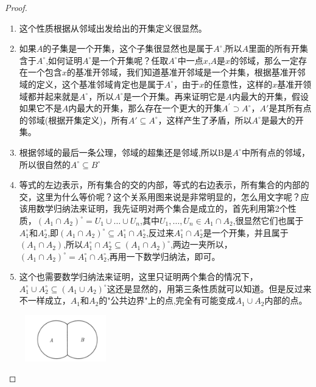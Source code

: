 \begin{proof}
\begin{enumerate}
	\item 这个性质根据从邻域出发给出的开集定义很显然。
	\item 如果$A$的子集是一个开集，这个子集很显然也是属于$A^{\circ}$,所以$A$里面的所有开集含于$A^{\circ}$,如何证明$A^{\circ}$是一个开集呢？任取$A^{\circ}$中一点$x$,$A$是$x$的邻域，那么一定存在一个包含$x$的基准开邻域，我们知道基准开邻域是一个并集，根据基准开邻域的定义，这个基准邻域肯定也是属于$A^{\circ}$，由于$x$的任意性，这样的$x$基准开领域都并起来就是$A^{\circ}$，所以$A^{\circ}$是一个开集。再来证明它是$A$内最大的开集，假设如果它不是$A$内最大的开集，那么存在一个更大的开集$A^{'} \supset A^{\circ}$，$A'$是其所有点的邻域(根据开集定义)，所有$A' \subseteq A^{\circ}$，这样产生了矛盾，所以$A^{\circ}$是最大的开集。
	\item 根据邻域的最后一条公理，邻域的超集还是邻域,所以B是$A^{\circ}$中所有点的邻域，所以很自然的$A^{\circ} \subseteq B^{\circ}$
	\item 等式的左边表示，所有集合的交的内部，等式的右边表示，所有集合的内部的交，这里为什么等价呢？这个关系用图来说是非常明显的，怎么用文字呢？应该用数学归纳法来证明，我先证明对两个集合是成立的，首先利用第2个性质，${(A_1 \cap A_2)}^{\circ}=U_1 \cup \ldots \cup U_n $,其中$U_1,\ldots,U_n \in A_1 \cap A_2$,很显然它们也属于$A_1^{\circ}$和$A_2^{\circ}$,即${(A_1 \cap A_2)}^{\circ} \subseteq A_1^{\circ} \cap A_2^{\circ}$,反过来$A_1^{\circ} \cap A_2^{\circ}$是一个开集，并且属于$(A_1 \cap A_2)$,所以$A_1^{\circ} \cap A_2^{\circ} \subseteq {(A_1 \cap A_2)}^{\circ}$,两边一夹所以，${(A_1 \cap A_2)}^{\circ} = A_1^{\circ} \cap A_2^{\circ}$,再用一下数学归纳法，即可。
	\item 这个也需要数学归纳法来证明，这里只证明两个集合的情况下，$A_1^{\circ} \cup A_2^{\circ} \subseteq {(A_1 \cup A_2)}^{\circ}$这还是显然的，用第三条性质就可以知道。但是反过来不一样成立，$A_1$和$A_2$的"公共边界"上的点,完全有可能变成$A_1 \cup A_2$内部的点。
	\begin{center}
		\includegraphics[width=4cm, height=2cm]{images/A_B_same_border.png}
	\end{center}	
\end{enumerate}
\end{proof}

